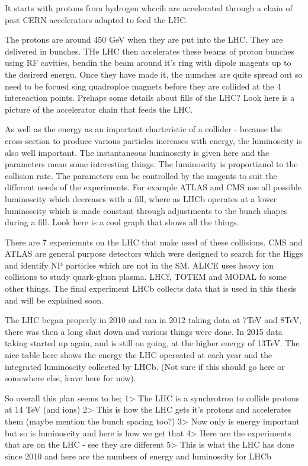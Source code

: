 It starts with protons from hydrogen whccih are accelerated through a chain of past CERN accelerators adapted to feed the LHC. 

The protons are around 450 GeV when they are put into the LHC. They are delivered in bunches. THe LHC then accelerates these beams of proton bunches using RF cavities, bendin the beam around it's ring with dipole magents up to the desirerd energu. Once they have made it, the numches are quite spread out so need to be focued sing quadroploe magnets before they are collided at the 4 intereaction points. Prehaps some details about fills of the LHC? Look here is a picture of the accelerator chain that feeds the LHC. 

As well as the energy as an important charteristic of a collider - because the cross-section to produce various particles increases with energy, the luminoscity  is also well important. The instantaneous luminoscity is given here and the parameters mean some interesting things. The luminoscity is proportianol to the collision rate. The parameters can be controlled by the magents to suit the different needs of the experiments. For example ATLAS and CMS use all possible luminoscity which decreases with a fill, where as LHCb operates at a lower luminoscity which is made constant through adjustments to the bunch shapes during a fill. Look here is a cool graph that shows all the things.

There are 7 experiemnts on the LHC that make used of these collisions. CMS and ATLAS are general purpose detectors which were designed to search for the Higgs and identify NP particles which are not in the SM. ALICE uses heavy ion collisions to study quark-gluon plasma. LHCf, TOTEM and MODAL fo some other things. The final experiment LHCb collects data that is used in this thesis and will be explained soon.

The LHC began properly in 2010 and ran in 2012 taking data at 7TeV and 8TeV, there was then a long shut down and various things were done. In 2015 data taking started up again, and is still on going, at the higher energy of 13TeV. The nice table here shows the energy the LHC opereated at each year and the integrated luminoscity collected by LHCb. (Not sure if this should go here or somewhere else, leave here for now).



So overall this plan seems to be;
1> The LHC is a synchrotron to collide protons at 14 TeV (and ions)
2> This is how the LHC gets it's protons and accelerates them (maybe mention the bunch spacing too?)
3> Now only is energy important but so is luminoscity and here is how we get that
4> Here are the experiments that are on the LHC - see they are different
5> This is what the LHC has done since 2010 and here are the numbers of energy and luminoscity for LHCb 


